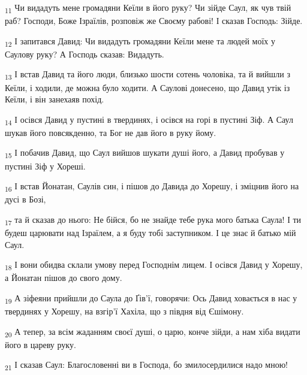 \begin{tcolorbox}
\textsubscript{11} Чи видадуть мене громадяни Кеїли в його руку? Чи зійде Саул, як чув твій раб? Господи, Боже Ізраїлів, розповіж же Своєму рабові! І сказав Господь: Зійде.
\end{tcolorbox}
\begin{tcolorbox}
\textsubscript{12} І запитався Давид: Чи видадуть громадяни Кеїли мене та людей моїх у Саулову руку? А Господь сказав: Видадуть.
\end{tcolorbox}
\begin{tcolorbox}
\textsubscript{13} І встав Давид та його люди, близько шости сотень чоловіка, та й вийшли з Кеїли, і ходили, де можна було ходити. А Саулові донесено, що Давид утік із Кеїли, і він занехаяв похід.
\end{tcolorbox}
\begin{tcolorbox}
\textsubscript{14} І осівся Давид у пустині в твердинях, і осівся на горі в пустині Зіф. А Саул шукав його повсякденно, та Бог не дав його в руку йому.
\end{tcolorbox}
\begin{tcolorbox}
\textsubscript{15} І побачив Давид, що Саул вийшов шукати душі його, а Давид пробував у пустині Зіф у Хореші.
\end{tcolorbox}
\begin{tcolorbox}
\textsubscript{16} І встав Йонатан, Саулів син, і пішов до Давида до Хорешу, і зміцнив його на дусі в Бозі,
\end{tcolorbox}
\begin{tcolorbox}
\textsubscript{17} та й сказав до нього: Не бійся, бо не знайде тебе рука мого батька Саула! І ти будеш царювати над Ізраїлем, а я буду тобі заступником. І це знає й батько мій Саул.
\end{tcolorbox}
\begin{tcolorbox}
\textsubscript{18} І вони обидва склали умову перед Господнім лицем. І осівся Давид у Хорешу, а Йонатан пішов до свого дому.
\end{tcolorbox}
\begin{tcolorbox}
\textsubscript{19} А зіфеяни прийшли до Саула до Ґів'ї, говорячи: Ось Давид ховається в нас у твердинях у Хорешу, на взгір'ї Хахіла, що з півдня від Єшімону.
\end{tcolorbox}
\begin{tcolorbox}
\textsubscript{20} А тепер, за всім жаданням своєї душі, о царю, конче зійди, а нам хіба видати його в цареву руку.
\end{tcolorbox}
\begin{tcolorbox}
\textsubscript{21} І сказав Саул: Благословенні ви в Господа, бо змилосердилися надо мною!
\end{tcolorbox}
